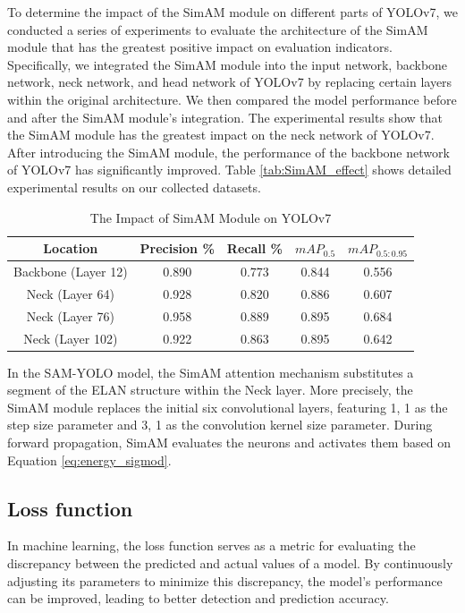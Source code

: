 \documentclass[aic]{iosart2x}
\begin{document}
To determine the impact of the SimAM module on different parts of YOLOv7, we conducted a series of experiments to evaluate the architecture of the SimAM module that has the greatest positive impact on evaluation indicators. Specifically, we integrated the SimAM module into the input network, backbone network, neck network, and head network of YOLOv7 by replacing certain layers within the original architecture.  We then compared the model performance before and after the SimAM module's integration. The experimental results show that the SimAM module has the greatest impact on the neck network of YOLOv7. After introducing the SimAM module, the performance of the backbone network of YOLOv7 has significantly improved. Table \ref{tab:SimAM_effect} shows detailed experimental results on our collected datasets.

\begin{table}[!htbp]
    \centering
    \caption{The Impact of SimAM Module on YOLOv7}
    
    \begin{tabular}{ccccc}
        \toprule
 Location            & Precision \% & Recall \% & $mAP_{0.5}$ & $mAP_{0.5:0.95}$ \\ \midrule
 Backbone (Layer 12) & 0.890        & 0.773     & 0.844       & 0.556            \\
 Neck (Layer 64)     & 0.928        & 0.820     & 0.886       & 0.607            \\
 Neck (Layer 76)     & 0.958        & 0.889     & 0.895       & 0.684            \\
 Neck (Layer 102)    & 0.922        & 0.863     & 0.895       & 0.642            \\ \bottomrule
    \end{tabular}
\end{table}

In the SAM-YOLO model, the SimAM attention mechanism substitutes a segment of the ELAN structure within the Neck layer. More precisely, the SimAM module replaces the initial six convolutional layers, featuring {1, 1} as the step size parameter and {3, 1} as the convolution kernel size parameter. During forward propagation, SimAM evaluates the neurons and activates them based on Equation \ref{eq:energy_sigmod}.

\subsection{Loss function}

In machine learning, the loss function serves as a metric for evaluating the discrepancy between the predicted and actual values of a model. By continuously adjusting its parameters to minimize this discrepancy, the model's performance can be improved, leading to better detection and prediction accuracy.
\end{document}
